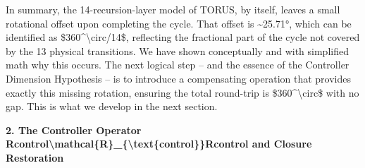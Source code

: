 \documentclass[]{article}
\begin{document}
{In summary, the 14-recursion-layer model of TORUS, by itself, leaves a
small rotational offset upon completing the cycle. That offset is
\textasciitilde{}25.71°, which can be identified as
\$360\^{}\textbackslash{}circ/14\$, reflecting the fractional part of
the cycle not covered by the 13 physical transitions. We have shown
conceptually and with simplified math why this occurs. The next logical
step -- and the essence of the Controller Dimension Hypothesis -- is to
introduce a compensating operation that provides exactly this missing
rotation, ensuring the total round-trip is
\$360\^{}\textbackslash{}circ\$ with no gap. This is what we develop in
the next section.

\textbf{2. The Controller Operator
Rcontrol\textbackslash{}mathcal\{R\}\_\{\textbackslash{}text\{control\}\}Rcontrol​
and Closure Restoration}

}
\end{document}
